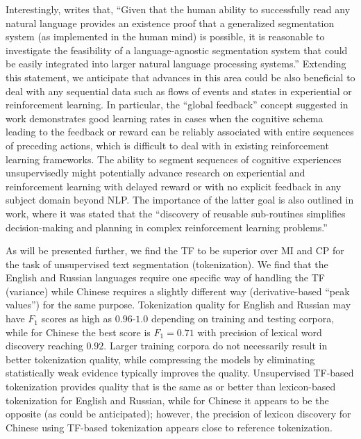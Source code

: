 \documentclass[11pt]{article}
\begin{document}
Interestingly, \citet{11} writes that, “Given that the human ability to successfully read any natural language provides an existence proof that a generalized segmentation system (as implemented in the human mind) is possible, it is reasonable to investigate the feasibility of a language-agnostic segmentation system that could be easily integrated into larger natural language processing systems.” Extending this statement, we anticipate that advances in this area could be also beneficial to deal with any sequential data such as flows of events and states in experiential or reinforcement learning. In particular, the “global feedback” concept suggested in  work demonstrates good learning rates in cases when the cognitive schema leading to the feedback or reward can be reliably associated with entire sequences of preceding actions, which is difficult to deal with in existing reinforcement learning frameworks. The ability to segment sequences of cognitive experiences unsupervisedly might potentially advance research on experiential and reinforcement learning with delayed reward or with no explicit feedback in any subject domain beyond NLP. The importance of the latter goal is also outlined in  work, where it was stated that the “discovery of reusable sub-routines simplifies decision-making and planning in complex reinforcement learning problems.”

As will be presented further, we find the TF to be superior over MI \citep[see][]{5, 6, 7, 11} and CP \citep[see][]{12} for the task of unsupervised text segmentation (tokenization). We find that the English and Russian languages require one specific way of handling the TF (variance) while Chinese requires a slightly different way (derivative-based “peak values”) for the same purpose. Tokenization quality for English and Russian may have $F_1$ scores as high as $0.96$-$1.0$ depending on training and testing corpora, while for Chinese the best score is $F_1=0.71$ with precision of lexical word discovery reaching $0.92$. Larger training corpora do not necessarily result in better tokenization quality, while compressing the models by eliminating statistically weak evidence typically improves the quality. Unsupervised TF-based tokenization provides quality that is the same as or better than lexicon-based tokenization for English and Russian, while for Chinese it appears to be the opposite (as could be anticipated); however, the precision of lexicon discovery for Chinese using TF-based tokenization appears close to reference tokenization.
\end{document}
